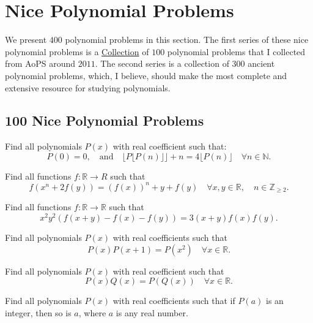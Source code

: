 \section{Nice Polynomial Problems}

We present $400$ polynomial problems in this section. The first series of these nice polynomial problems is a \href{https://artofproblemsolving.com/community/c6h397768p2212439}{Collection} of $100$ polynomial problems that I collected from AoPS around $2011$. The second series is a collection of $300$ ancient polynomial problems, which, I believe, should make the most complete and extensive resource for studying polynomials.

\subsection{100 Nice Polynomial Problems}



\begin{question}
Find all polynomials $P(x)$ with real coefficient such that:
\[P(0)=0 , \quad \text{and} \quad \lfloor P \lfloor P(n)\rfloor \rfloor +n=4\lfloor P(n) \rfloor \quad \forall n \in \mathbb N.\]
\end{question}

\begin{question}
Find all functions $f: \mathbb R\to R$ such that
\[f(x^n+2f(y))=(f(x))^n +y+f(y) \quad  \forall x, y \in \mathbb R, \quad  n \in \mathbb Z_{\geq 2}.\]
\end{question}

\begin{question}
Find all functions $ f : \mathbb R\to \mathbb R$ such that
\[ x^2y^2 \left( f(x+y)-f(x)-f(y) \right)=3(x+y)f(x)f(y).\]
\end{question}

\begin{question}
Find all polynomials $P(x)$ with real coefficients such that
\[P(x)P(x + 1) = P(x^2) \quad \forall x \in \mathbb R.\]
\end{question}

\begin{question}
Find all polynomials $P(x)$ with real coefficient such that
\[P(x)Q(x)=P(Q(x)) \quad \forall x \in \mathbb R.\]
\end{question}


\begin{question}
Find all polynomials $P(x)$ with real coefficients such that if $P(a)$ is an integer, then so is $a$, where $a$ is any real number.
\end{question}


